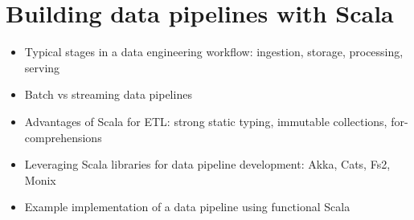 \chapter{ Building data pipelines with Scala }

\begin{itemize}
    \item Typical stages in a data engineering workflow: ingestion, storage, processing, serving
    \item Batch vs streaming data pipelines
    \item Advantages of Scala for ETL: strong static typing, immutable collections, for-comprehensions
    \item Leveraging Scala libraries for data pipeline development: Akka, Cats, Fs2, Monix
    \item Example implementation of a data pipeline using functional Scala
\end{itemize}

